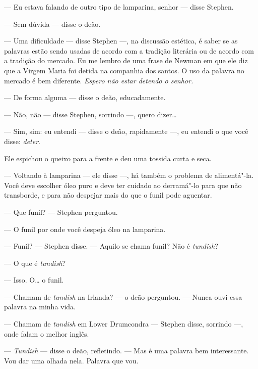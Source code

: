  --- Eu estava falando de outro tipo de lamparina, senhor --- disse Stephen.

 --- Sem dúvida --- disse o deão.

 --- Uma dificuldade --- disse Stephen ---, na discussão estética, é saber se as
palavras estão sendo usadas de acordo com a tradição literária ou de
acordo com a tradição do mercado. Eu me lembro de uma frase de Newman
em que ele diz que a Virgem Maria foi detida na companhia dos santos. O
uso da palavra no mercado é bem diferente. \textit{Espero não estar
detendo o senhor.}

 --- De forma alguma --- disse o deão, educadamente.

 --- Não, não --- disse Stephen, sorrindo ---, quero dizer\ldots{}

 --- Sim, sim: eu entendi --- disse o deão, rapidamente ---, eu entendi o que você
disse: \textit{deter}.

Ele espichou o queixo para a frente e deu uma tossida curta e seca.

 --- Voltando à lamparina --- ele disse ---, há também o problema de alimentá"-la.
Você deve escolher óleo puro e deve ter cuidado ao derramá"-lo para que
não transborde, e para não despejar mais do que o funil pode aguentar.

 --- Que funil? --- Stephen perguntou.

 --- O funil por onde você despeja óleo na lamparina.

 --- Funil? --- Stephen disse. --- Aquilo se chama funil? Não é \textit{tundish}?

 --- O que é \textit{tundish}?

 --- Isso. O\ldots{} o funil.

 --- Chamam de \textit{tundish} na Irlanda? --- o deão perguntou. --- Nunca ouvi
essa palavra na minha vida.

 --- Chamam de \textit{tundish} em Lower Drumcondra --- Stephen disse,
sorrindo ---, onde falam o melhor inglês.

 --- \textit{Tundish} --- disse o deão, refletindo. --- Mas é uma palavra bem
interessante. Vou dar uma olhada nela. Palavra que vou.

